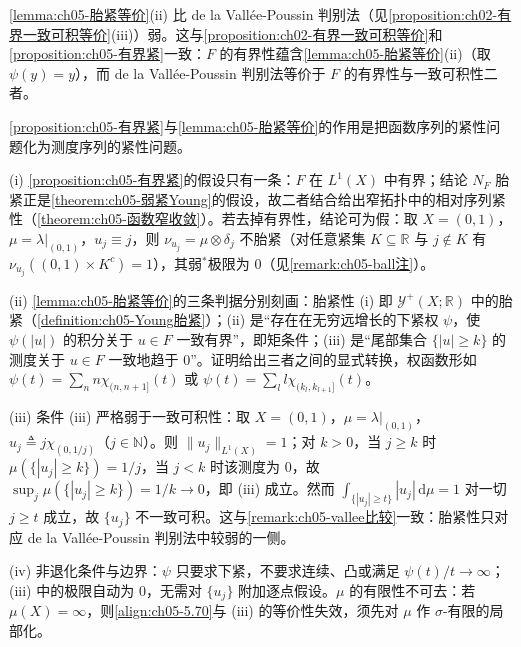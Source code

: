 \documentclass[../../main.tex]{subfiles}%
\begin{document}
\begin{remark}\label{remark:ch05-vallee比较}
\cref{lemma:ch05-胎紧等价}(ii) 比 de la Vallée-Poussin 判别法（见\cref{proposition:ch02-有界一致可积等价}(iii)）弱。这与\cref{proposition:ch02-有界一致可积等价}和\cref{proposition:ch05-有界紧}一致：$F$ 的有界性蕴含\cref{lemma:ch05-胎紧等价}(ii)（取 $\psi(y)=y$），而 de la Vallée-Poussin 判别法等价于 $F$ 的有界性与一致可积性二者。
\end{remark}

\begin{remark}\label{remark:ch05-胎紧判据函数}
\cref{proposition:ch05-有界紧}与\cref{lemma:ch05-胎紧等价}的作用是把函数序列的紧性问题化为测度序列的紧性问题。

(i) \cref{proposition:ch05-有界紧}的假设只有一条：$F$ 在 $L^1(X)$ 中有界；结论 $N_F$ 胎紧正是\cref{theorem:ch05-弱紧Young}的假设，故二者结合给出窄拓扑中的相对序列紧性（\cref{theorem:ch05-函数窄收敛}）。若去掉有界性，结论可为假：取 $X=(0,1)$，$\mu=\lambda|_{(0,1)}$，$u_j\equiv j$，则 $\nu_{u_j}=\mu\otimes\delta_j$ 不胎紧（对任意紧集 $K\subseteq\mathbb{R}$ 与 $j\notin K$ 有 $\nu_{u_j}((0,1)\times K^c)=1$），其弱$^*$极限为 $0$（见\cref{remark:ch05-ball注}）。

(ii) \cref{lemma:ch05-胎紧等价}的三条判据分别刻画：胎紧性 (i) 即 $\mathcal{Y}^+(X;\mathbb{R})$ 中的胎紧（\cref{definition:ch05-Young胎紧}）；(ii) 是“存在在无穷远增长的下紧权 $\psi$，使 $\psi(|u|)$ 的积分关于 $u\in F$ 一致有界”，即矩条件；(iii) 是“尾部集合 $\{|u|\geqslant k\}$ 的测度关于 $u\in F$ 一致地趋于 $0$”。证明给出三者之间的显式转换，权函数形如 $\psi(t)=\sum_nn\chi_{(n,n+1]}(t)$ 或 $\psi(t)=\sum_ll\chi_{(k_l,k_{l+1}]}(t)$。

(iii) 条件 (iii) 严格弱于一致可积性：取 $X=(0,1)$，$\mu=\lambda|_{(0,1)}$，$u_j\triangleq j\chi_{(0,1/j)}$（$j\in\mathbb{N}$）。则 $\|u_j\|_{L^1(X)}=1$；对 $k>0$，当 $j\geqslant k$ 时 $\mu(\{|u_j|\geqslant k\})=1/j$，当 $j<k$ 时该测度为 $0$，故 $\sup_{j}\mu(\{|u_j|\geqslant k\})=1/k\to0$，即 (iii) 成立。然而 $\int_{\{|u_j|\geqslant t\}}|u_j|\,\mathrm{d}\mu=1$ 对一切 $j\geqslant t$ 成立，故 $\{u_j\}$ 不一致可积。这与\cref{remark:ch05-vallee比较}一致：胎紧性只对应 de la Vallée-Poussin 判别法中较弱的一侧。

(iv) 非退化条件与边界：$\psi$ 只要求下紧，不要求连续、凸或满足 $\psi(t)/t\to\infty$；(iii) 中的极限自动为 $0$，无需对 $\{u_j\}$ 附加逐点假设。$\mu$ 的有限性不可去：若 $\mu(X)=\infty$，则\eqref{align:ch05-5.70}与 (iii) 的等价性失效，须先对 $\mu$ 作 $\sigma$-有限的局部化。
\end{remark}
\end{document}
